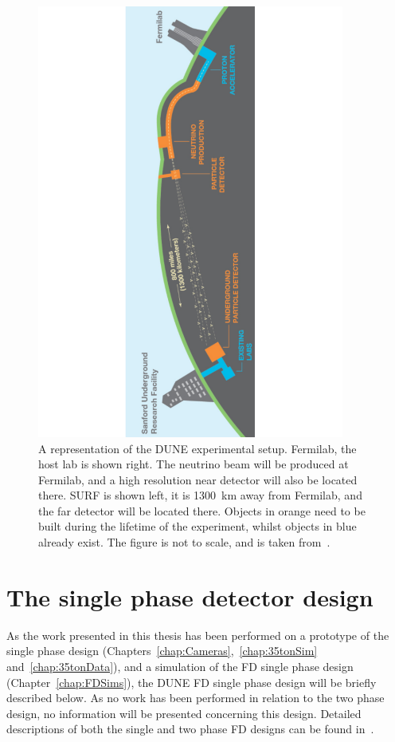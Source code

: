\begin{figure}
  \centering
  \includegraphics[width=0.9\textwidth]{DUNESchematic}
  \caption[A representation of the DUNE experimental setup]
          {A representation of the DUNE experimental setup. Fermilab, the host lab is shown right. The neutrino beam will be produced at Fermilab, and a high resolution near detector will also be located there. SURF is shown left, it is 1300~km away from Fermilab, and the far detector will be located there. Objects in orange need to be built during the lifetime of the experiment, whilst objects in blue already exist. The figure is not to scale, and is taken from~\citep{DUNECDR_V1}.}
  \label{fig:DUNESchematic}
\end{figure}

\section{The single phase detector design} \label{sec:DUNEDetector_SP}
As the work presented in this thesis has been performed on a prototype of the single phase design (Chapters~\ref{chap:Cameras},~\ref{chap:35tonSim} and~\ref{chap:35tonData}), and a simulation of the FD single phase design (Chapter~\ref{chap:FDSims}), the DUNE FD single phase design will be briefly described below. As no work has been performed in relation to the two phase design, no information will be presented concerning this design. Detailed descriptions of both the single and two phase FD designs can be found in~\citep{DUNECDR_V4}. \\

